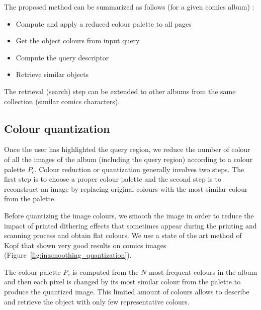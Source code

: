The proposed method can be summarized as follows (for a given comics album) :
\begin{itemize}
  \item Compute and apply a reduced colour palette to all pages
  \item Get the object colours from input query
  \item Compute the query descriptor
  \item Retrieve similar objects
\end{itemize}

The retrieval (search) step can be extended to other albums from the same collection (similar comics characters).
 


\subsection{Colour quantization}
Once the user has highlighted the query region, we reduce the number of colour of all the images of the album (including the query region) according to a colour palette $P_c$.
Colour reduction or quantization generally involves two steps.
The first step is to choose a proper colour palette and the second step is to reconstruct an image by replacing original colours with the most similar colour from the palette.


Before quantizing the image colours, we smooth the image in order to reduce the impact of printed dithering effects that sometimes appear during the printing and scanning process and obtain flat colours.
We use a state of the art method of Kopf that shown very good results on comics images~\cite{Kopf2012DigitalReconstruction} (Figure~\ref{fig:in:smoothing_quantization}).

The colour palette $P_c$ is computed from the $N$ most frequent colours in the album and then each pixel is changed by its most similar colour from the palette to produce the quantized image.
This limited amount of colours allows to describe and retrieve the object with only few representative colours.

